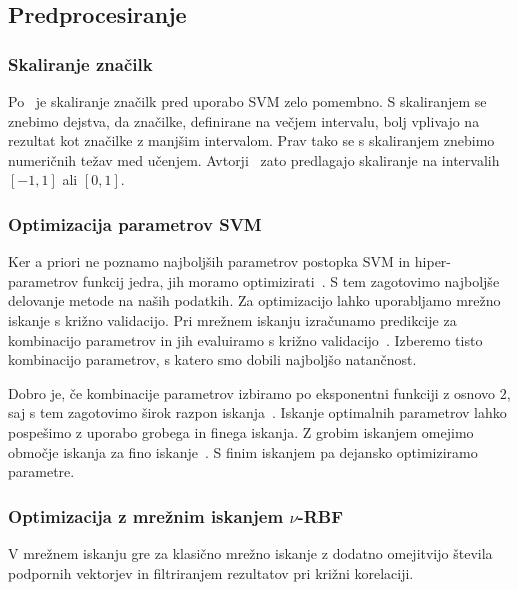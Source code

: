 {\subsection{Predprocesiranje}
\subsubsection{Skaliranje značilk}

Po~\cite{hsu2003practical} je skaliranje značilk pred uporabo SVM zelo pomembno. S skaliranjem se znebimo dejstva, da značilke, definirane na večjem intervalu, bolj vplivajo na rezultat kot značilke z manjšim intervalom. Prav tako se s skaliranjem znebimo numeričnih težav med učenjem. Avtorji~\cite{hsu2003practical} zato predlagajo skaliranje na intervalih $[-1, 1]$ ali $[0, 1]$.







\subsubsection{Optimizacija parametrov SVM}\label{sec:optimizacija-svm-parametrov}

Ker a priori ne poznamo najboljših parametrov postopka SVM in hiper-parametrov funkcij jedra, jih moramo optimizirati~\cite{hsu2003practical}. S tem zagotovimo najboljše delovanje metode na naših podatkih. Za optimizacijo lahko uporabljamo mrežno iskanje s križno validacijo.  Pri mrežnem iskanju izračunamo predikcije za kombinacijo parametrov in jih evaluiramo s križno validacijo~\cite{hsu2003practical}. Izberemo tisto kombinacijo parametrov, s katero smo dobili najboljšo natančnost. 

Dobro je, če kombinacije parametrov izbiramo po eksponentni funkciji z osnovo $2$, saj s tem zagotovimo širok razpon iskanja~\cite{hsu2003practical}. Iskanje optimalnih parametrov lahko pospešimo z uporabo grobega in finega iskanja. Z grobim iskanjem omejimo območje iskanja za fino iskanje~\cite{hsu2003practical}. S finim iskanjem pa dejansko optimiziramo parametre.


\subsubsection{Optimizacija z mrežnim iskanjem \texorpdfstring{$\nu$}{nu}-RBF}\label{sec:nurbf}
V mrežnem iskanju \nurbf gre za klasično mrežno iskanje z dodatno omejitvijo števila podpornih vektorjev in filtriranjem rezultatov pri križni korelaciji.

}
